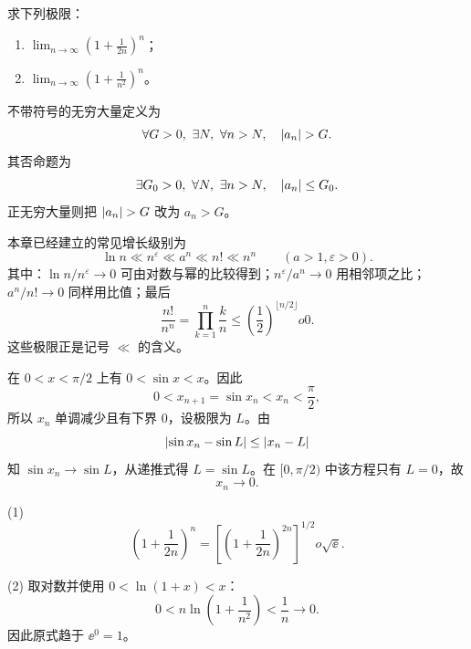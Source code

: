 \begin{xexercise}[2]
求下列极限：
  \begin{enumerate}[label=(\arabic*)]
    \item $\displaystyle\lim_{n\to\infty}\left(1+\frac1{2n}\right)^n$；
    \item $\displaystyle\lim_{n\to\infty}\left(1+\frac1{n^2}\right)^n$。
  \end{enumerate}
\end{xexercise}
\begin{xsolution}
不带符号的无穷大量定义为
\[
  \forall G>0,\ \exists N,\ \forall n>N,
  \quad\lvert a_n\rvert>G.
\]
其否命题为
\[
  \exists G_0>0,\ \forall N,\ \exists n>N,
  \quad\lvert a_n\rvert\le G_0.
\]
正无穷大量则把 $\lvert a_n\rvert>G$ 改为 $a_n>G$。

本章已经建立的常见增长级别为
\[
  \ln n\ll n^\varepsilon\ll a^n\ll n!\ll n^n
  \qquad(a>1,\varepsilon>0).
\]
其中：$\ln n/n^\varepsilon\to0$ 可由对数与幂的比较得到；$n^\varepsilon/a^n\to0$ 用相邻项之比；$a^n/n!\to0$ 同样用比值；最后
\[
  \frac{n!}{n^n}
  =\prod_{k=1}^n\frac kn
  \le\left(\frac12\right)^{\lfloor n/2\rfloor}	o0.
\]
这些极限正是记号 $\ll$ 的含义。

在 $0<x<\pi/2$ 上有 $0<\sin x<x$。因此
\[
  0<x_{n+1}=\sin x_n<x_n<\frac\pi2,
\]
所以 $x_n$ 单调减少且有下界 $0$，设极限为 $L$。由
\[
  \lvert\sin x_n-\sin L\rvert\le\lvert x_n-L\rvert
\]
知 $\sin x_n\to\sin L$，从递推式得 $L=\sin L$。在 $[0,\pi/2)$ 中该方程只有 $L=0$，故
\[
  \boxed{x_n\to0}.
\]

(1)
\[
  \left(1+\frac1{2n}\right)^n
  =\left[\left(1+\frac1{2n}\right)^{2n}\right]^{1/2}	o\sqrt\ee.
\]

(2) 取对数并使用 $0<\ln(1+x)<x$：
\[
  0<n\ln\left(1+\frac1{n^2}\right)<\frac1n\to0.
\]
因此原式趋于 $\ee^0=1$。
\end{xsolution}


